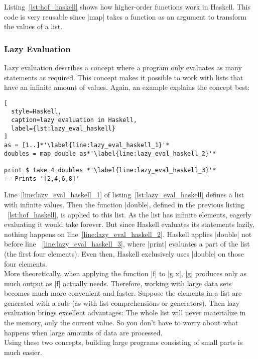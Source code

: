 Listing~\ref{lst:hof_haskell} shows how higher-order functions work in Haskell.
This code is very reusable since |map| takes a function as an argument to
transform the values of a list.

\subsubsection{Lazy Evaluation} %
\label{subsub:Evaluation}
Lazy evaluation describes a concept where a program only evaluates as many
statements as required. This concept makes it possible to work with lists that
have an infinite amount of values. Again, an example explains the concept best:

\begin{lstlisting}[
  style=Haskell,
  caption=lazy evaluation in Haskell,
  label={lst:lazy_eval_haskell}
]
as = [1..]*'\label{line:lazy_eval_haskell_1}'*
doubles = map double as*'\label{line:lazy_eval_haskell_2}'*

print $ take 4 doubles *'\label{line:lazy_eval_haskell_3}'*
-- Prints '[2,4,6,8]'
\end{lstlisting}
Line~\ref{line:lazy_eval_haskell_1} of listing~\ref{lst:lazy_eval_haskell}
defines a list with infinite values. Then the function |double|, defined in the
previous listing ~\ref{lst:hof_haskell}, is applied to this list. As the list
has infinite elements, eagerly evaluating it would take forever. But since
Haskell evaluates its statements lazily, nothing happens on
line~\ref{line:lazy_eval_haskell_2}. Haskell applies |double| not before line
~\ref{line:lazy_eval_haskell_3}, where |print| evaluates a part of the list (the
first four elements). Even then, Haskell exclusively uses |double| on those
four elements.\\
More theoretically, when applying the function |f| to |g x|, |g| produces only
as much output as |f| actually needs. Therefore, working with large data sets
becomes much more convenient and faster. Suppose the elements in a list are
generated with a rule (as with list comprehensions or generators). Then lazy
evaluation brings excellent advantages: The whole list will never materialize
in the memory, only the current value. So you don't have to worry about what
happens when large amounts of data are processed. \\ Using these two concepts,
building large programs consisting of small parts is much easier.


